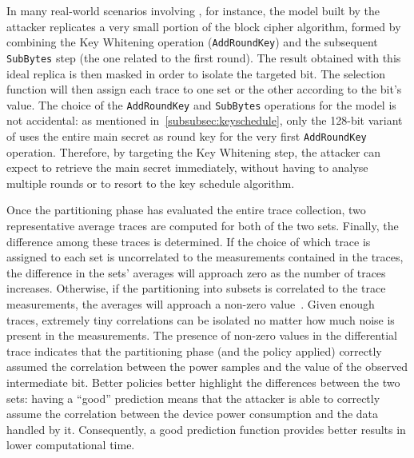         In many real-world scenarios involving \aess{}, for instance, the model built by the attacker replicates a very small portion of the block cipher algorithm, formed by combining the Key Whitening operation (\texttt{AddRoundKey}) and the subsequent \texttt{SubBytes} step (the one related to the first round). The result obtained with this ideal replica is then masked in order to isolate the targeted bit. The selection function will then assign each trace to one set or the other according to the bit's value. The choice of the \texttt{AddRoundKey} and \texttt{SubBytes} operations for the model is not accidental: as mentioned in~\ref{subsubsec:keyschedule}, only the 128-bit variant of \aes{} uses the entire main secret as round key for the very first \texttt{AddRoundKey} operation. Therefore, by targeting the Key Whitening step, the attacker can expect to retrieve the main secret immediately, without having to analyse multiple rounds or to resort to the key schedule algorithm.

            
        Once the partitioning phase has evaluated the entire trace collection, two representative average traces are computed for both of the two sets. Finally, the difference among these traces is determined. If the choice of which trace is assigned to each set is uncorrelated to the measurements contained in the traces, the difference in the sets' averages will approach zero as the number of traces increases. Otherwise, if the partitioning into subsets is correlated to the trace measurements, the averages will approach a non-zero value~\cite{kocher2011introduction}. Given enough traces, extremely tiny correlations can be isolated no matter how much noise is present in the measurements. The presence of non-zero values in the differential trace indicates that the partitioning phase (and the policy applied) correctly assumed the correlation between the power samples and the value of the observed intermediate bit. Better policies better highlight the differences between the two sets: having a ``good'' prediction means that the attacker is able to correctly assume the correlation between the device power consumption and the data handled by it. Consequently, a good prediction function provides better results in lower computational time.

